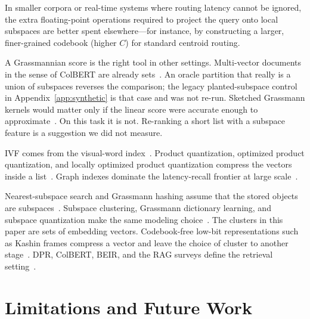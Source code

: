 \documentclass[sigconf,nonacm]{acmart}
\begin{document}
In smaller corpora or real-time systems where routing latency cannot be ignored, the extra floating-point operations required to project the query onto local subspaces are better spent elsewhere—for instance, by constructing a larger, finer-grained codebook (higher $C$) for standard centroid routing.

A Grassmannian score is the right tool in other settings. Multi-vector documents in the sense of ColBERT are already sets~\cite{khattab2020colbert}. An oracle partition that really is a union of subspaces reverses the comparison; the legacy planted-subspace control in Appendix~\ref{app:synthetic} is that case and was not re-run. Sketched Grassmann kernels would matter only if the linear score were accurate enough to approximate~\cite{delogne2025random,delogne2026bounded}. On this task it is not. Re-ranking a short list with a subspace feature is a suggestion we did not measure.

IVF comes from the visual-word index~\cite{sivic2003video}. Product quantization, optimized product quantization, and locally optimized product quantization compress the vectors inside a list~\cite{jegou2011product,ge2014opq,kalantidis2014lopq}. Graph indexes dominate the latency-recall frontier at large scale~\cite{malkov2018hnsw,fu2019nsg,wang2021graphann}.

Nearest-subspace search and Grassmann hashing assume that the stored objects are subspaces~\cite{basri2011approximate,wang2013fast}. Subspace clustering, Grassmann dictionary learning, and subspace quantization make the same modeling choice~\cite{elhamifar2013sparse,vidal2011subspace,liu2013lrr,wang2014lrr,cetingul2009intrinsic,harandi2013dictionary,harandi2015extrinsic,marrinan2014finding,stiverson2020subspace,turaga2011statistical,wong1967grassmann,absil2004riemannian,absil2008optimization,bendokat2024handbook,zhang2018grassmannian}. The clusters in this paper are sets of embedding vectors. Codebook-free low-bit representations such as Kashin frames compress a vector and leave the choice of cluster to another stage~\cite{paul2026kashin}. DPR, ColBERT, BEIR, and the RAG surveys define the retrieval setting~\cite{karpukhin2020dpr,khattab2020colbert,thakur2021beir,lewis2020rag,gao2023ragsurvey}.

\section{Limitations and Future Work}
\label{sec:limit}
\end{document}
